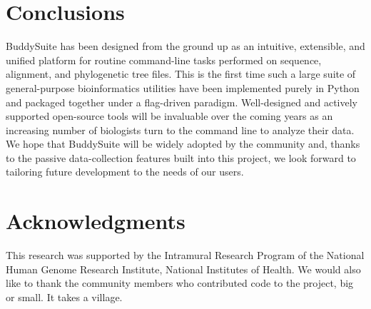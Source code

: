 \documentclass[nogrid]{MBE_article}%
\begin{document}
\section{Conclusions}
BuddySuite has been designed from the ground up as an intuitive, extensible, and unified platform for routine command-line tasks performed on sequence, alignment, and phylogenetic tree files. This is the first time such a large suite of general-purpose bioinformatics utilities have been implemented purely in Python and packaged together under a flag-driven paradigm. Well-designed and actively supported open-source tools will be invaluable over the coming years as an increasing number of biologists turn to the command line to analyze their data. We hope that BuddySuite will be widely adopted by the community and, thanks to the passive data-collection features built into this project, we look forward to tailoring future development to the needs of our users.


\section{Acknowledgments}
This research was supported by the Intramural Research Program of the National Human Genome Research Institute, National Institutes of Health. We would also like to thank the community members who contributed code to the project, big or small. It takes a village.


\end{document}
